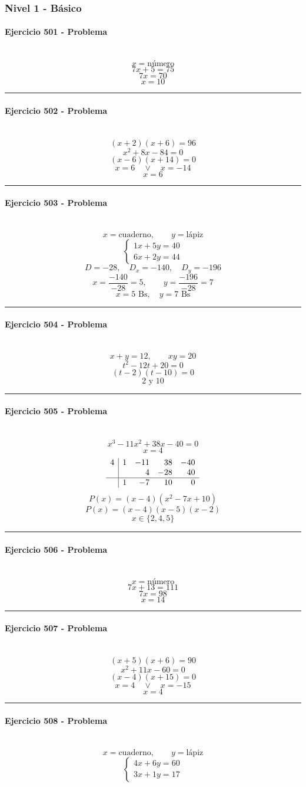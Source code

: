 \documentclass[10pt,a4paper]{article}
\newcommand{\res}[1]{\paragraph{#1}\mbox{}\\[-1.2em]}
\begin{document}
\subsubsection*{Nivel 1 - Básico}
\res{Ejercicio 501 - Problema}
\[ x=\text{número} \]
\[ 7x+5=75 \]
\[ 7x=70 \]
\[ \boxed{x=10} \]
\vspace{1mm}\hrule\vspace{2mm}
\res{Ejercicio 502 - Problema}
\[ (x+2)(x+6)=96 \]
\[ x^{2} + 8 x - 84=0 \]
\[ (x-6)(x+14)=0 \]
\[ x=6\quad \vee \quad x=-14 \]
\[ \boxed{x=6} \]
\vspace{1mm}\hrule\vspace{2mm}
\res{Ejercicio 503 - Problema}
\[ x=\text{cuaderno},\qquad y=\text{lápiz} \]
\[ \begin{cases}1x+5y=40\\6x+2y=44\end{cases} \]
\[ D=-28,\quad D_x=-140,\quad D_y=-196 \]
\[ x=\frac{-140}{-28}=5,\qquad y=\frac{-196}{-28}=7 \]
\[ \boxed{x=5\text{ Bs},\quad y=7\text{ Bs}} \]
\vspace{1mm}\hrule\vspace{2mm}
\res{Ejercicio 504 - Problema}
\[ x+y=12,\qquad xy=20 \]
\[ t^2-12t+20=0 \]
\[ (t-2)(t-10)=0 \]
\[ \boxed{2\text{ y }10} \]
\vspace{1mm}\hrule\vspace{2mm}
\res{Ejercicio 505 - Problema}
\[ x^{3} - 11 x^{2} + 38 x - 40=0 \]
\[ x=4 \]
\[\begin{array}{r|rrrr}4 & 1 & -11 & 38 & -40\\  &  & 4 & -28 & 40\\\hline  & 1 & -7 & 10 & 0\end{array}\]
\[ P(x)=(x-4)(x^{2} - 7 x + 10) \]
\[ P(x)=(x-4)(x-5)(x-2) \]
\[ \boxed{x\in\{2,4,5\}} \]
\vspace{1mm}\hrule\vspace{2mm}
\res{Ejercicio 506 - Problema}
\[ x=\text{número} \]
\[ 7x+13=111 \]
\[ 7x=98 \]
\[ \boxed{x=14} \]
\vspace{1mm}\hrule\vspace{2mm}
\res{Ejercicio 507 - Problema}
\[ (x+5)(x+6)=90 \]
\[ x^{2} + 11 x - 60=0 \]
\[ (x-4)(x+15)=0 \]
\[ x=4\quad \vee \quad x=-15 \]
\[ \boxed{x=4} \]
\vspace{1mm}\hrule\vspace{2mm}
\res{Ejercicio 508 - Problema}
\[ x=\text{cuaderno},\qquad y=\text{lápiz} \]
\[ \begin{cases}4x+6y=60\\3x+1y=17\end{cases} \]
\end{document}

